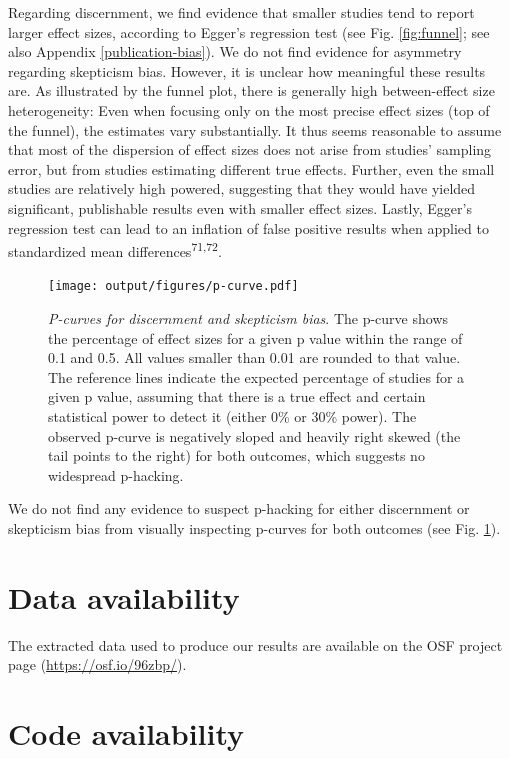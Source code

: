 \documentclass[
  man]{apa6}
\begin{document}
Regarding discernment, we find evidence that smaller studies tend to report larger effect sizes, according to Egger's regression test (see Fig. \ref{fig:funnel}; see also Appendix \ref{publication-bias}). We do not find evidence for asymmetry regarding skepticism bias. However, it is unclear how meaningful these results are. As illustrated by the funnel plot, there is generally high between-effect size heterogeneity: Even when focusing only on the most precise effect sizes (top of the funnel), the estimates vary substantially. It thus seems reasonable to assume that most of the dispersion of effect sizes does not arise from studies' sampling error, but from studies estimating different true effects. Further, even the small studies are relatively high powered, suggesting that they would have yielded significant, publishable results even with smaller effect sizes. Lastly, Egger's regression test can lead to an inflation of false positive results when applied to standardized mean differences\textsuperscript{71,72}.



\begin{figure}
\centering
\texttt{[image: output/figures/p-curve.pdf]}
\caption{\label{fig:p-curve}\emph{P-curves for discernment and skepticism bias}. The p-curve shows the percentage of effect sizes for a given p value within the range of 0.1 and 0.5. All values smaller than 0.01 are rounded to that value. The reference lines indicate the expected percentage of studies for a given p value, assuming that there is a true effect and certain statistical power to detect it (either 0\% or 30\% power). The observed p-curve is negatively sloped and heavily right skewed (the tail points to the right) for both outcomes, which suggests no widespread p-hacking.}
\end{figure}

We do not find any evidence to suspect p-hacking for either discernment or skepticism bias from visually inspecting p-curves for both outcomes (see Fig. \ref{fig:p-curve}).

\section{Data availability}\label{data-availability}

The extracted data used to produce our results are available on the OSF project page (\url{https://osf.io/96zbp/}).

\section{Code availability}\label{code-availability}
\end{document}
